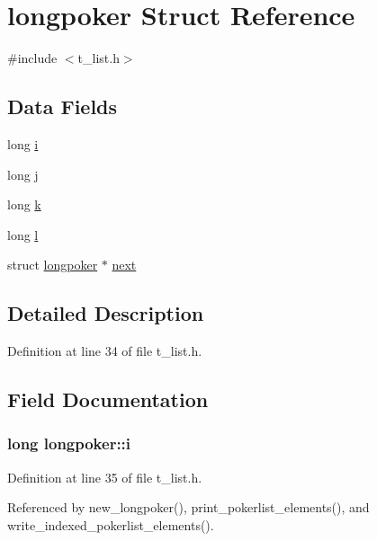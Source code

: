 \hypertarget{structlongpoker}{\section{longpoker Struct Reference}
\label{structlongpoker}
}


{\ttfamily \#include $<$t\-\_\-list.\-h$>$}

\subsection*{Data Fields}
\begin{DoxyCompactItemize}
\item 
long \hyperlink{structlongpoker_a8b4bc9d6b05b6c29c0bcb61309c7182d}{i}
\item 
long \hyperlink{structlongpoker_a22a8f8c53ef43a705ad9c6fc8ae738ed}{j}
\item 
long \hyperlink{structlongpoker_a8208bf9986edd07dcb8334ebef57476c}{k}
\item 
long \hyperlink{structlongpoker_a93823f89553e9099ead1f04466c47bdd}{l}
\item 
struct \hyperlink{structlongpoker}{longpoker} $\ast$ \hyperlink{structlongpoker_ac0b1dc3839bc45cc411086348e86eb1e}{next}
\end{DoxyCompactItemize}


\subsection{Detailed Description}


Definition at line 34 of file t\-\_\-list.\-h.



\subsection{Field Documentation}
\hypertarget{structlongpoker_a8b4bc9d6b05b6c29c0bcb61309c7182d}{
\subsubsection[{i}]{\setlength{\rightskip}{0pt plus 5cm}long longpoker\-::i}}\label{structlongpoker_a8b4bc9d6b05b6c29c0bcb61309c7182d}


Definition at line 35 of file t\-\_\-list.\-h.



Referenced by new\-\_\-longpoker(), print\-\_\-pokerlist\-\_\-elements(), and write\-\_\-indexed\-\_\-pokerlist\-\_\-elements().

